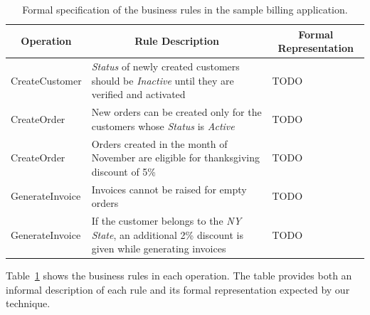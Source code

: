 \begin{table}[t]
\caption{Formal specification of the business rules in the sample billing application.}
\centering
{\scriptsize
\begin{tabular}{|l|l|l|}
\hline
\multicolumn{1}{|c|}{\small Operation} &
\multicolumn{1}{|c|}{\small Rule Description} &
\multicolumn{1}{|c|}{\small Formal Representation} \\
\hline \hline
CreateCustomer & \textit{Status} of newly created customers should be \textit{Inactive} until they are verified and activated
& TODO \\
\hline
CreateOrder 	 & New orders can be created only for the customers whose \textit{Status} is \textit{Active} 
& TODO \\
\hline
CreateOrder 	 & Orders created in the month of November are eligible for thanksgiving discount of 5\%
& TODO \\
\hline
GenerateInvoice& Invoices cannot be raised for empty orders
& TODO \\
\hline
GenerateInvoice& If the customer belongs to the \textit{NY} \textit{State}, an additional 2\% discount is given while generating invoices
& TODO \\
\hline
\end{tabular}
}
\vspace*{-10pt}
\label{tab:bookstore-rules-spec}
\end{table}

Table~\ref{tab:bookstore-rules-spec} shows the business rules in each operation. The table provides
both an informal description of each rule and its formal representation expected by our technique.
